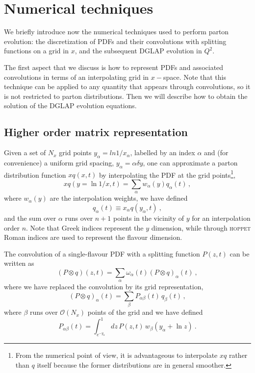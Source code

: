\documentclass[12pt]{article}
\newcommand{\lp}{\left(}
\newcommand{\rp}{\right)}
\newcommand{\hoppet}{\textsc{hoppet}\xspace}
\begin{document}
\section{Numerical techniques}
\label{tricks}
We briefly introduce now the numerical techniques used to perform
parton evolution: the discretization of PDFs and
their convolutions with splitting functions on a grid in $x$,
and the subsequent DGLAP evolution in $Q^2$. 

The first aspect that we discuss is how to represent PDFs
and associated convolutions in terms of an interpolating grid
in $x-$space.
Note that this technique can be applied to any quantity
that appears through convolutions, so it is not restricted
to parton distributions. Then we will describe how
to obtain the solution of the DGLAP evolution equations.

\subsection{Higher order matrix representation}
\label{sec:highord}


Given a set of $N_x$ grid points $y_\alpha=ln 1/x_{\alpha}$, 
labelled by an
index $\alpha$ and
(for convenience) a uniform grid spacing, $y_\alpha = \alpha \delta
y$, one can approximate a parton distribution function 
$xq \lp x,t \rp$ by
interpolating the PDF at the grid points\footnote{From the 
numerical point of view, it is
advantageous to interpolate $xq$ rather than $q$ itself because
the former distributions are in general smoother.},
\begin{equation}
  xq(y=\ln 1/x,t) = \sum_\alpha w_\alpha(y) q_\alpha(t)\,,
\end{equation}
where $w_\alpha(y)$ are the interpolation weights, 
we have defined
\begin{equation}
 q_{\alpha}(t) \equiv
x_{\alpha}q(y_\alpha,t) \ ,
\end{equation}
and the sum over $\alpha$ runs over $n+1$ points in the
vicinity of $y$ for an interpolation order $n$. Note that Greek
indices represent the $y$ dimension, while through \hoppet Roman indices
are  used to represent the flavour dimension.


The convolution of a single-flavour PDF with a splitting function
$P(z,t)$ can be written as
\begin{equation}
  (P \otimes q)(z,t) = \sum_{\alpha} \omega_{\alpha}(t)
 (P \otimes q)_\alpha(t) \ ,
\end{equation}
where we have replaced the convolution by its grid representation,
\begin{equation}
  (P \otimes q)_\alpha(t) = \sum_{\beta} P_{\alpha\beta}(t) \, q_\beta(t)\,,
\end{equation}
where $\beta$ runs over $\mathcal{O}\lp N_x \rp$ points of the grid and we have
defined
\begin{equation}
  \label{eq:Palphabeta}
  P_{\alpha\beta}(t) = \int_{e^{-y_{\alpha}}}^1 dz
 \,P(z,t)\, w_\beta(y_\alpha + \ln z)\  .
\end{equation}
\end{document}
